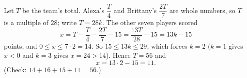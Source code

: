 Let $T$ be the team's total. Alexa's $\dfrac{T}{4}$ and Brittany's $\dfrac{2T}{7}$ are whole numbers, so $T$ is a multiple of $28$; write $T=28k$. The other seven players scored
\[x=T-\dfrac{T}{4}-\dfrac{2T}{7}-15=\dfrac{13T}{28}-15=13k-15\]
points, and $0\le x\le7\cdot2=14$. So $15\le13k\le29$, which forces $k=2$ ($k=1$ gives $x<0$ and $k=3$ gives $x=24>14$). Hence $T=56$ and
\[x=13\cdot2-15=\boxed{11}.\]
(Check: $14+16+15+11=56$.)
